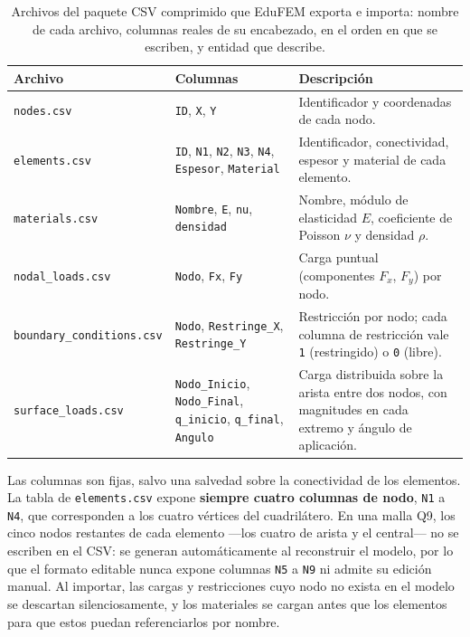 \begin{table}[htbp]
\centering
\caption[Archivos CSV del paquete de modelo y sus columnas.]{Archivos del paquete CSV comprimido que EduFEM exporta e importa: nombre de cada archivo, columnas reales de su encabezado, en el orden en que se escriben, y entidad que describe.}
\label{tab:csv-archivos}
\begin{tabular}{p{3.6cm} p{5.0cm} p{4.6cm}}
\toprule
\textbf{Archivo} & \textbf{Columnas} & \textbf{Descripción} \\
\midrule
\texttt{nodes.csv} & \texttt{ID}, \texttt{X}, \texttt{Y} & Identificador y coordenadas de cada nodo. \\
\texttt{elements.csv} & \texttt{ID}, \texttt{N1}, \texttt{N2}, \texttt{N3}, \texttt{N4}, \texttt{Espesor}, \texttt{Material} & Identificador, conectividad, espesor y material de cada elemento. \\
\texttt{materials.csv} & \texttt{Nombre}, \texttt{E}, \texttt{nu}, \texttt{densidad} & Nombre, módulo de elasticidad $E$, coeficiente de Poisson $\nu$ y densidad $\rho$. \\
\texttt{nodal\_loads.csv} & \texttt{Nodo}, \texttt{Fx}, \texttt{Fy} & Carga puntual (componentes $F_x$, $F_y$) por nodo. \\
\texttt{boundary\_conditions.csv} & \texttt{Nodo}, \texttt{Restringe\_X}, \texttt{Restringe\_Y} & Restricción por nodo; cada columna de restricción vale \texttt{1} (restringido) o \texttt{0} (libre). \\
\texttt{surface\_loads.csv} & \texttt{Nodo\_Inicio}, \texttt{Nodo\_Final}, \texttt{q\_inicio}, \texttt{q\_final}, \texttt{Angulo} & Carga distribuida sobre la arista entre dos nodos, con magnitudes en cada extremo y ángulo de aplicación. \\
\bottomrule
\end{tabular}
\end{table}

Las columnas son fijas, salvo una salvedad sobre la conectividad de los elementos. La tabla de \texttt{elements.csv} expone \textbf{siempre cuatro columnas de nodo}, \texttt{N1} a \texttt{N4}, que corresponden a los cuatro vértices del cuadrilátero. En una malla Q9, los cinco nodos restantes de cada elemento ---los cuatro de arista y el central--- no se escriben en el CSV: se generan automáticamente al reconstruir el modelo, por lo que el formato editable nunca expone columnas \texttt{N5} a \texttt{N9} ni admite su edición manual. Al importar, las cargas y restricciones cuyo nodo no exista en el modelo se descartan silenciosamente, y los materiales se cargan antes que los elementos para que estos puedan referenciarlos por nombre.

